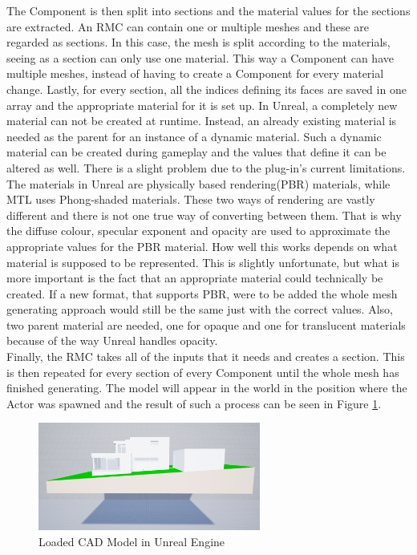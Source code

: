 The Component is then split into sections and the material values for the sections are extracted. An \acs{RMC} can contain one or multiple meshes and these are regarded as sections. In this case, the mesh is split according to the materials, seeing as a section can only use one material. This way a Component can have multiple meshes, instead of having to create a Component for every material change. Lastly, for every section, all the indices defining its faces are saved in one array and the appropriate material for it is set up. In Unreal, a completely new material can not be created at runtime. Instead, an already existing material is needed as the parent for an instance of a dynamic material. Such a dynamic material can be created during gameplay and the values that define it can be altered as well. There is a slight problem due to the plug-in's current limitations. The materials in Unreal are physically based rendering(\acs{PBR}) materials\cite{bib:UEPBR}, while MTL uses Phong-shaded materials\cite{bib:MTL}. These two ways of rendering are vastly different and there is not one true way of converting between them. That is why the diffuse colour, specular exponent and opacity are used to approximate the appropriate values for the \acs{PBR} material. How well this works depends on what material is supposed to be represented. This is slightly unfortunate, but what is more important is the fact that an appropriate material could technically be created. If a new format, that supports \acs{PBR}, were to be added the whole mesh generating approach would still be the same just with the correct values. Also, two parent material are needed, one for opaque and one for translucent materials because of the way Unreal handles opacity.\\
Finally, the \acs{RMC} takes all of the inputs that it needs and creates a section. This is then repeated for every section of every Component until the whole mesh has finished generating. The model will appear in the world in the position where the Actor was spawned and the result of such a process can be seen in Figure \ref{fig:LoadedModel}.

\begin{figure}[htpb]
	\centering
	\includegraphics[width=0.65\textwidth]{fig/LoadedModel2.png}
	\caption[Loaded CAD Model in Unreal Engine]{Loaded CAD Model in Unreal Engine\protect\footnotemark}
	\label{fig:LoadedModel}
\end{figure}

